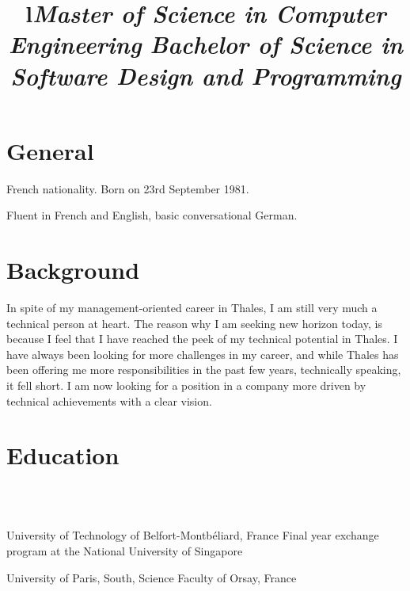 \documentclass[overlapped,line,letterpaper]{res}
\begin{document}
\begin{resume}


  \section{\bf General}
  French nationality. Born on 23rd September 1981.

  Fluent in French and English, basic conversational German.


  \section{\bf Background}

  In spite of my management-oriented career in Thales, I am still very much a
  technical person at heart. The reason why I am seeking new horizon today, is
  because I feel that I have reached the peek of my technical potential in
  Thales. I have always been looking for more challenges in my career, and while
  Thales has been offering me more responsibilities in the past few years,
  technically speaking, it fell short. I am now looking for a position in a
  company more driven by technical achievements with a clear vision.


  \section{\bf Education}

  \begin{format}
    \title{l}\\
    \body\\
  \end{format}

  \title{\em Master of Science in Computer Engineering }
  \begin{position}
    University of Technology of Belfort-Montb\'{e}liard, France\newline
    Final year exchange program at the National University of Singapore
  \end{position}

  \title{\em Bachelor of Science in Software Design and Programming }
  \begin{position}
    University of Paris, South, Science Faculty of Orsay, France
  \end{position}


\end{resume}
\end{document}
